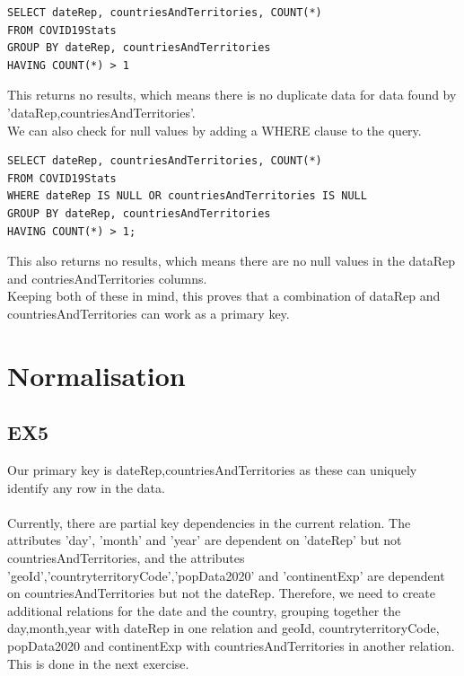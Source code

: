 \documentclass[]{article}
\begin{document}
\begin{verbatim}
SELECT dateRep, countriesAndTerritories, COUNT(*)
FROM COVID19Stats
GROUP BY dateRep, countriesAndTerritories
HAVING COUNT(*) > 1
\end{verbatim}
This returns no results, which means there is no duplicate data for data found by 'dataRep,countriesAndTerritories'.\\
We can also check for null values by adding a WHERE clause to the query.

\begin{verbatim}
SELECT dateRep, countriesAndTerritories, COUNT(*)
FROM COVID19Stats
WHERE dateRep IS NULL OR countriesAndTerritories IS NULL
GROUP BY dateRep, countriesAndTerritories
HAVING COUNT(*) > 1;
\end{verbatim}
This also returns no results, which means there are no null values in the dataRep and contriesAndTerritories columns.
\\Keeping both of these in mind, this proves that a combination of dataRep and countriesAndTerritories can work as a primary key.

\section{Normalisation}
\subsection{EX5}
Our primary key is dateRep,countriesAndTerritories as these can uniquely identify any row in the data.\\
\\Currently, there are partial key dependencies in the current relation. The attributes 'day', 'month' and 'year' are dependent on 'dateRep' but not countriesAndTerritories, and the attributes 'geoId','countryterritoryCode','popData2020' and 'continentExp' are dependent on countriesAndTerritories but not the dateRep. Therefore, we need to create additional relations for the date and the country, grouping together the day,month,year with dateRep in one relation and geoId, countryterritoryCode, popData2020 and continentExp with countriesAndTerritories in another relation. This is done in the next exercise.
\end{document}
